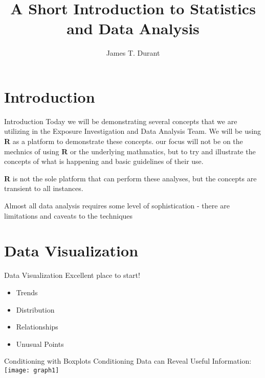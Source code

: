 \documentclass{beamer}
\title[Statistics and Data Analysis]{A Short Introduction to Statistics and Data Analysis}
\author{James T. Durant}
\begin{document}


\begin{frame}
\titlepage
\end{frame}

\section{Introduction}
\begin{frame}{Introduction}
Today we will be demonstrating several concepts that we are utilizing in the Exposure Investigation and Data Analysis Team. We will be using \textbf{R} as a platform to demonstrate these concepts. our focus will not be on the mechnics of using \textbf{R} or the underlying mathmatics, but to try and illustrate the concepts of what is happening and basic guidelines of their use.

 \textbf{R} is not the sole platform that can perform these analyses, but the concepts are transient to all instances.

\alert{Almost all data analysis requires some level of sophistication - there are limitations and caveats to the techniques }

\end{frame}


\section{Data Visualization}


\begin{frame}{Data Visualization}
Excellent place to start!

\begin{itemize}
\item Trends
\item Distribution
\item Relationships
\item Unusual Points
\end {itemize}

\end{frame}

\begin{frame}{Conditioning with Boxplots}
Conditioning Data can Reveal Useful Information:
\texttt{[image: graph1]}


\end{frame}
\end{document}
